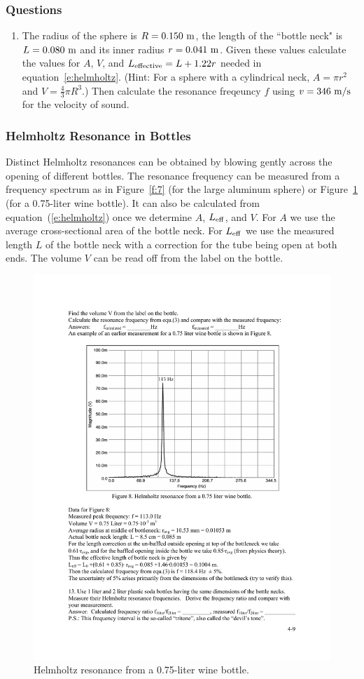 \documentclass[11pt]{NSF}
\def\ben{\begin{enumerate}}
\def\een{\end{enumerate}}
\def\i{\item{}}
\begin{document}
\subsubsection*{Questions}
\ben
\i The radius of the sphere is $R=0.150~{\rm m}$, the length of the ``bottle neck" is 
$L=0.080~{\rm m}$ and its inner radius $r=0.041~{\rm m}$.
Given these values calculate the values for 
$A$, $V$, and $L_{\rm effective}=L+1.22 r$ needed in equation~\ref{e:helmholtz}.
(Hint: For a sphere with a cylindrical neck, $A=\pi r^2$ and $V = \frac{4}{3}\pi R^3$.)
Then calculate the resonance freqeuncy $f$ using $v=346~{\rm m/s}$ for the 
velocity of sound.

\een

\subsubsection{Helmholtz Resonance in Bottles}

Distinct Helmholtz resonances can be obtained by blowing 
gently across the opening of different bottles. 
The resonance frequency can be measured from a 
frequency spectrum as in Figure~\ref{f:7} (for the 
large aluminum sphere) or 
Figure~\ref{f:8} (for a 0.75-liter wine bottle).
It can also be calculated from equation~(\ref{e:helmholtz})
once we determine $A$, $L_{\rm eff}$, and $V$.
For $A$ we use the average cross-sectional area of the
bottle neck.
For $L_{\rm eff}$ we use the measured length $L$ of the 
bottle neck with a correction for the tube being open at 
both ends.
The volume $V$ can be read off from the label on the bottle.
%
\begin{figure}[hbtp]
\begin{center}
\includegraphics[width=.7\textwidth]{fig4_8}
\caption{Helmholtz resonance from a 0.75-liter wine bottle.}
\label{f:8} 
\end{center} 
\end{figure}
%
\end{document}
